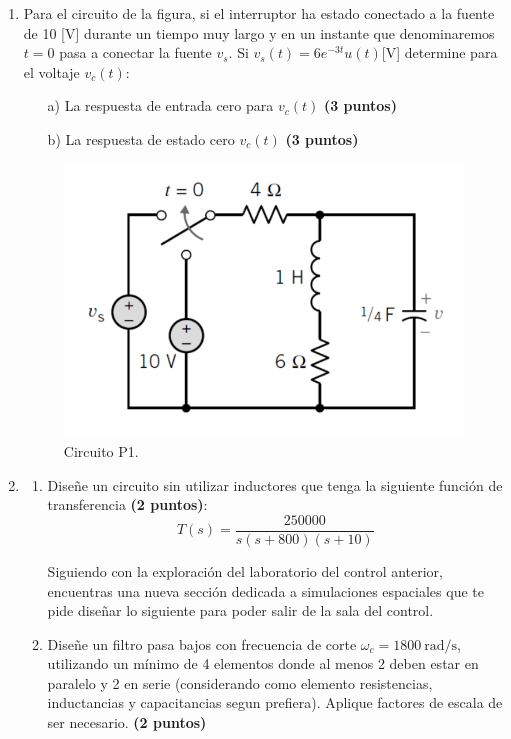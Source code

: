 \documentclass[
	spanish, %
	letterpaper, oneside
]{article}
\begin{document}
\templatePagecfg

\begin{enumerate}
    \item 
    Para el circuito de la figura, si el interruptor ha estado conectado a la fuente de 10 [V] durante un tiempo muy largo y en un instante que denominaremos $t = 0$ pasa a conectar la fuente $v_s$. Si $v_s(t) = 6e^{-3t}u(t)$[V]  determine para el voltaje $v_c(t)$:

    \begin{enumerate}
     \item[a)] La respuesta de entrada cero para $v_c(t)$ \textbf{(3 puntos)}
     \item[b)] La respuesta de estado cero $v_c(t)$ \textbf{(3 puntos)}
    \end{enumerate}

    
    \begin{figure}[h!]
        \centering
        \includegraphics[width=0.5\linewidth]{img/Figura_4.png}
        \caption{Circuito P1.}
        \label{fig:p1}
    \end{figure}
    
    \item 
    \begin{enumerate}[label=(\alph*)]
        \item Diseñe un circuito sin utilizar inductores que tenga la siguiente función de transferencia \textbf{(2 puntos)}:
        \begin{equation}
            T(s) = \frac{250000}{s(s + 800)(s + 10)}
        \end{equation}
        
      Siguiendo con la exploración del laboratorio del control anterior, encuentras una nueva sección dedicada a simulaciones espaciales que te pide diseñar lo siguiente para poder salir de la sala del control.

        \item Diseñe un filtro pasa bajos con frecuencia de corte $\omega_c = 1800~\text{rad/s}$, utilizando un mínimo de 4 elementos donde al menos 2 deben estar en paralelo y 2 en serie (considerando como elemento resistencias, inductancias y capacitancias segun prefiera). Aplique factores de escala de ser necesario. \textbf{(2 puntos)}
    

\end{enumerate}
\end{enumerate}
\end{document}
